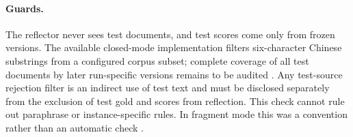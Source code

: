 \paragraph{Guards.} The reflector never sees test documents, and test scores come only from frozen versions. The available closed-mode implementation filters six-character Chinese substrings from a configured corpus subset; complete coverage of all test documents by later run-specific versions remains to be audited . Any test-source rejection filter is an indirect use of test text and must be disclosed separately from the exclusion of test gold and scores from reflection. This check cannot rule out paraphrase or instance-specific rules. In fragment mode this was a convention rather than an automatic check .
